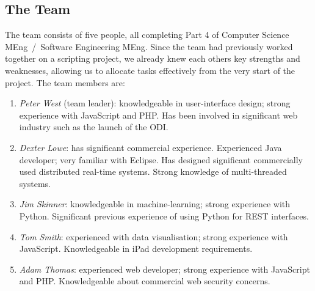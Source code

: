 


\subsection{The Team}

The team consists of five people, all completing Part 4 of Computer Science MEng~/~Software Engineering MEng. Since the team had previously worked together on a scripting project, we already knew each others key strengths and weaknesses, allowing us to allocate tasks effectively from the very start of the project. The team members are:
\begin{enumerate}
\item \textit{Peter West} (team leader): knowledgeable in user-interface design; strong experience with JavaScript and PHP. Has been involved in significant web industry such as the launch of the ODI.
\item \textit{Dexter Lowe}: has significant commercial experience. Experienced Java developer; very familiar with Eclipse. Has designed significant commercially used distributed real-time systems. Strong knowledge of multi-threaded systems. 
\item \textit{Jim Skinner}: knowledgeable in machine-learning; strong experience with Python. Significant previous experience of using Python for REST interfaces.
\item \textit{Tom Smith}: experienced with data visualisation; strong experience with JavaScript. Knowledgeable in iPad development requirements.
\item \textit{Adam Thomas}: experienced web developer; strong experience with JavaScript and PHP. Knowledgeable about commercial web security concerns.
\end{enumerate}

